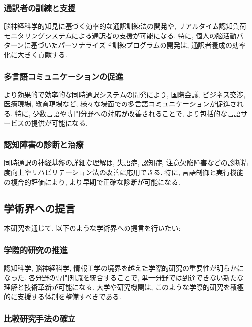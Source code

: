 \subsubsection{通訳者の訓練と支援}

脳神経科学的知見に基づく効率的な通訳訓練法の開発や, リアルタイム認知負荷モニタリングシステムによる通訳者の支援が可能になる.
特に, 個人の脳活動パターンに基づいたパーソナライズド訓練プログラムの開発は, 通訳者養成の効率化に大きく貢献する.

\subsubsection{多言語コミュニケーションの促進}

より効果的で効率的な同時通訳システムの開発により, 国際会議, ビジネス交渉, 医療現場, 教育現場など, 様々な場面での多言語コミュニケーションが促進される.
特に, 少数言語や専門分野への対応が改善されることで, より包括的な言語サービスの提供が可能になる.

\subsubsection{認知障害の診断と治療}

同時通訳の神経基盤の詳細な理解は, 失語症, 認知症, 注意欠陥障害などの診断精度向上やリハビリテーション法の改善に応用できる.
特に, 言語制御と実行機能の複合的評価により, より早期で正確な診断が可能になる.

\subsection{学術界への提言}

本研究を通じて, 以下のような学術界への提言を行いたい:

\subsubsection{学際的研究の推進}

認知科学, 脳神経科学, 情報工学の境界を越えた学際的研究の重要性が明らかになった.
各分野の専門知識を統合することで, 単一分野では到達できない新たな理解と技術革新が可能になる.
大学や研究機関は, このような学際的研究を積極的に支援する体制を整備すべきである.

\subsubsection{比較研究手法の確立}

